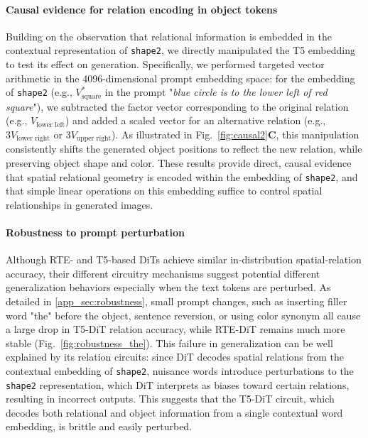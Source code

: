 \documentclass[10pt,twocolumn,letterpaper]{article}
\begin{document}
\paragraph{Causal evidence for relation encoding in object tokens}
Building on the observation that relational information is embedded in the contextual representation of \texttt{shape2}, we directly manipulated the T5 embedding to test its effect on generation. Specifically, we performed targeted vector arithmetic in the 4096-dimensional prompt embedding space: for the embedding of \texttt{shape2} (e.g., $V^*_{\text{square}}$ in the prompt "\textit{blue circle is to the lower left of red square}"), we subtracted the factor vector corresponding to the original relation (e.g., $V_{\text{lower left}}$) and added a scaled vector for an alternative relation (e.g., $3V_{\text{lower right}}$ or $3V_{\text{upper right}}$). As illustrated in Fig.~\ref{fig:causal2}\textbf{C}, this manipulation consistently shifts the generated object positions to reflect the new relation, while preserving object shape and color. These results provide direct, causal evidence that spatial relational geometry is encoded within the embedding of \texttt{shape2}, and that simple linear operations on this embedding suffice to control spatial relationships in generated images.


\paragraph{Robustness to prompt perturbation} 
Although RTE- and T5-based DiTs achieve similar in-distribution spatial-relation accuracy, their different circuitry mechanisms suggest potential different generalization behaviors especially when the text tokens are perturbed. As detailed in \ref{app_sec:robustness}, small prompt changes, such as inserting filler word "the" before the object, sentence reversion, or using color synonym all cause a large drop in T5-DiT relation accuracy, while RTE-DiT remains much more stable (Fig.~\ref{fig:robustness_the}). 
This failure in generalization can be well explained by its relation circuits: since DiT decodes spatial relations from the contextual embedding of \texttt{shape2}, nuisance words introduce perturbations to the \texttt{shape2} representation, which DiT interprets as biases toward certain relations, resulting in incorrect outputs. 
This suggests that the T5-DiT circuit, which decodes both relational and object information from a single contextual word embedding, is brittle and easily perturbed.
\end{document}
